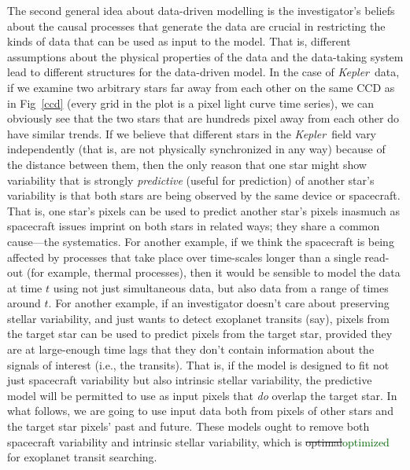 \documentclass[12pt, preprint]{aastex}
\newcommand{\project}[1]{\textsl{#1}}
\newcommand{\Kepler}{\project{Kepler}}
\newcommand{\revise}[1]{\textcolor{darkgreen}{#1}}
\newcommand{\remove}[1]{\sout{#1}}
\begin{document}
The second general idea about data-driven modelling is the investigator's beliefs about the causal processes that generate the data are crucial in restricting the kinds of data that can be used as input to the model.
That is, different assumptions about the physical properties of the data and the data-taking system lead to different structures for the data-driven model.
In the case of \Kepler\ data, if we examine two arbitrary stars far away from each other on the same CCD as in Fig~\ref{ccd} (every grid in the plot is a pixel light curve time series), we can obviously see that the two stars that are hundreds pixel away from each other do have similar trends. 
  If we believe that different stars in the \Kepler\ field vary independently 
  (that is, are not physically synchronized in any way) because of the distance between them, 
  then the only reason that one star might show variability that is strongly \emph{predictive} (useful for prediction) of another star's variability
  is that both stars are being observed by the same device or spacecraft.
That is, one star's pixels can be used to predict another star's pixels inasmuch as spacecraft issues imprint on both stars in related ways;
  they share a common cause---the systematics.  
For another example, if we think the spacecraft is being affected by
  processes that take place over time-scales longer than a single read-out
  (for example, thermal processes),
  then it would be sensible to model the data at time $t$ using not just simultaneous data, but also data from a range of times around $t$.
For another example, if an investigator doesn't care about preserving stellar variability,
  and just wants to detect exoplanet transits (say),
  pixels from the target star can be used to predict pixels from the target star,
  provided they are at large-enough time lags that they don't contain information about
  the signals of interest (i.e., the transits).
That is, if the model is designed to fit not just spacecraft variability
  but also intrinsic stellar variability,
  the predictive model will be permitted to use as input pixels that \emph{do} overlap the target star.
In what follows, we are going to use input data both from pixels of other stars and the target star pixels' past and future.
These models ought to remove both spacecraft variability and intrinsic stellar variability, which is \remove{optimal}\revise{optimized} for exoplanet transit searching.
\end{document}
